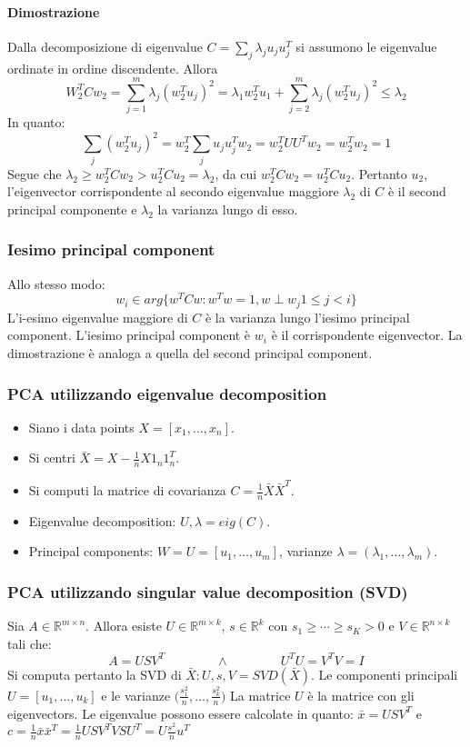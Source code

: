 		\paragraph{Dimostrazione}
		
		Dalla decomposizione di eigenvalue $C=\sum\limits_j\lambda_ju_ju_j^T$ si assumono le eigenvalue ordinate in ordine discendente.
		Allora
		$$W_2^TCw_2 = \sum\limits_{j=1}^m\lambda_j(w_2^Tu_j)^2=\lambda_1w_2^Tu_1+\sum\limits_{j=2}^m\lambda_j(w_2^Tu_j)^2\le\lambda_2$$
		In quanto:
		$$\sum\limits_j(w_2^Tu_j)^2 = w_2^T\sum\limits_ju_ju_j^Tw_2=w_2^TUU^Tw_2=w_2^Tw_2=1$$
		Segue che $\lambda_2\ge w_2^TCw_2 >u_2^TCu_2=\lambda_2$, da cui $w_2^TCw_2=u_2^TCu_2$.
		Pertanto $u_2$, l'eigenvector corrispondente al secondo eigenvalue maggiore $\lambda_2$ di $C$ \`e il second principal componente e $\lambda_2$ la varianza lungo di esso.
		
		\subsubsection{Iesimo principal component}
		Allo stesso modo:
		$$w_i\in arg\{w^TCw:w^Tw=1,w\perp w_j 1\le j < i\}$$
		L'i-esimo eigenvalue maggiore di $C$ \`e la varianza lungo l'iesimo principal component.
		L'iesimo principal component \`e $w_i$ \`e il corrispondente eigenvector.
		La dimostrazione \`e analoga a quella del second principal component.
		
		\subsubsection{PCA utilizzando eigenvalue decomposition}
		\begin{itemize}
			\item Siano i data points $X=[x_1,\dots,x_n]$.
			\item Si centri $\bar{X} = X-\frac{1}{n}X1_n1_n^T$.
			\item Si computi la matrice di covarianza $C=\frac{1}{n}\bar{X}\bar{X}^T$.
			\item Eigenvalue decomposition: $U,\lambda = eig(C)$.
			\item Principal components: $W=U=[u_1,\dots,u_m]$, varianze $\lambda = (\lambda_1,\dots,\lambda_m)$.
		\end{itemize}
		
		\subsubsection{PCA utilizzando singular value decomposition (SVD)}
		Sia $A\in\mathbb{R}^{m\times n}$.
		Allora esiste $U\in\mathbb{R}^{m\times k}$, $s\in\mathbb{R}^k$ con $s_1\ge\cdots\ge s_K >0$ e $V\in \mathbb{R}^{n\times k}$ tali che:
		$$A = USV^T\qquad\qquad\land\qquad\qquad U^TU=V^TV=I$$
		Si computa pertanto la SVD di $\bar{X}:U,s,V=SVD(\bar{X})$.
		Le componenti principali $U=[u_1,\dots,u_k]$ e le varianze $\bigl(\frac{s_1^2}{n},\dots,\frac{s_k^2}{n}\bigr)$
		La matrice $U$ \`e la matrice con gli eigenvectors.
		Le eigenvalue possono essere calcolate in quanto: $\bar{x} = USV^T$ e $c = \frac{1}{n}\bar{x}\bar{x}^T = \frac{1}{n}USV^TVSU^T=U\frac{s^2}{n}u^T$
		
